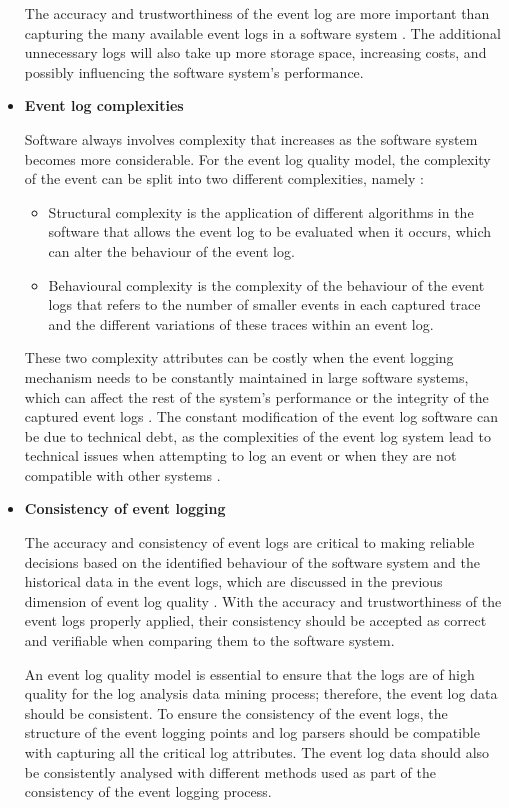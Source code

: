 \begin{itemize}
	The accuracy and trustworthiness of the event log are more important than capturing the many available event logs in a software system \cite{Zhu2015, Jans2012}. The additional unnecessary logs will also take up more storage space, increasing costs, and possibly influencing the software system's performance.
	
	\clearpage

	\item \textbf{Event log complexities}\par Software always involves complexity that increases as the software system becomes more considerable. For the event log quality model, the complexity of the event can be split into two different complexities, namely \cite{Kherbouche2017}:

	\begin{itemize}
		\item Structural complexity is the application of different algorithms in the software that allows the event log to be evaluated when it occurs, which can alter the behaviour of the event log.
		\item Behavioural complexity is the complexity of the behaviour of the event logs that refers to the number of smaller events in each captured trace and the different variations of these traces within an event log.
	\end{itemize}

	These two complexity attributes can be costly when the event logging mechanism needs to be constantly maintained in large software systems, which can affect the rest of the system’s performance or the integrity of the captured event logs \cite{Ogheneovo2014}. The constant modification of the event log software can be due to technical debt, as the complexities of the event log system lead to technical issues when attempting to log an event or when they are not compatible with other systems \cite{DeLeon-Sigg2020}.  

 	\item \textbf{Consistency of event logging}\par The accuracy and consistency of event logs are critical to making reliable decisions based on the identified behaviour of the software system and the historical data in the event logs, which are discussed in the previous dimension of event log quality \cite{Stojanov2017, Kherbouche2017}. With the accuracy and trustworthiness of the event logs properly applied, their consistency should be accepted as correct and verifiable when comparing them to the software system. \par An event log quality model is essential to ensure that the logs are of high quality for the log analysis data mining process; therefore, the event log data should be consistent. To ensure the consistency of the event logs, the structure of the event logging points and log parsers should be compatible with capturing all the critical log attributes. The event log data should also be consistently analysed with different methods used as part of the consistency of the event logging process.


\end{itemize}
